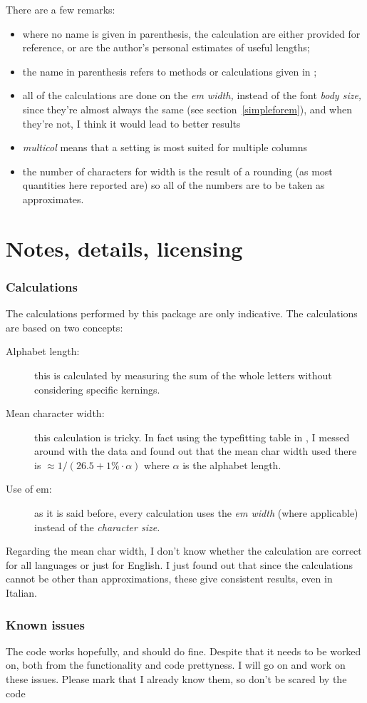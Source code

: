 \documentclass{article}
\begin{document}
There are a few remarks:
\begin{itemize}
\item where no name is given in parenthesis, the calculation are either provided for reference, or are the author’s personal estimates of useful lengths;
\item the name in parenthesis refers to methods or calculations given in \cite{bib:bringhurst,bib:felici};
\item all of the calculations are done on the \emph{em width,} instead of the font \emph{body size,} since they’re almost always the same (see section~\vref{simpleforem}), and when they’re not, I think it would lead to better results
\item \emph{multicol} means that a setting is most suited for multiple columns 
\item the number of characters for width is the result of a rounding (as most quantities here reported are) so all of the numbers are to be taken as approximates.
\end{itemize}
\part{Notes, details, licensing}
\section{Calculations}\label{calc}
The calculations performed by this package are only indicative. The calculations are based on two concepts:
\begin{description}
\item[Alphabet length:] this is calculated by measuring the sum of the whole letters without considering specific kernings.
\item[Mean character width:] this calculation is tricky. In fact using the typefitting table in \cite{bib:bringhurst}, I messed around with the data and found out that the mean char width used there is $\approx 1/(26.5+1\%\cdot \alpha)$ where $\alpha$ is the alphabet length. 
\item[Use of em:] as it is said before, every calculation uses the \emph{em width} (where applicable) instead of the \emph{character size.}
\end{description}
Regarding the mean char width, I don’t know whether the calculation are correct for all languages or just for English. I just found out that since the calculations cannot be other than approximations, these give consistent results, even in Italian.
\section{Known issues}
The code works hopefully, and should do fine. Despite that it needs to be worked on, both from the functionality and code prettyness. I will go on and work on these issues. Please mark that I already know them, so don’t be scared by the code
\end{document}
